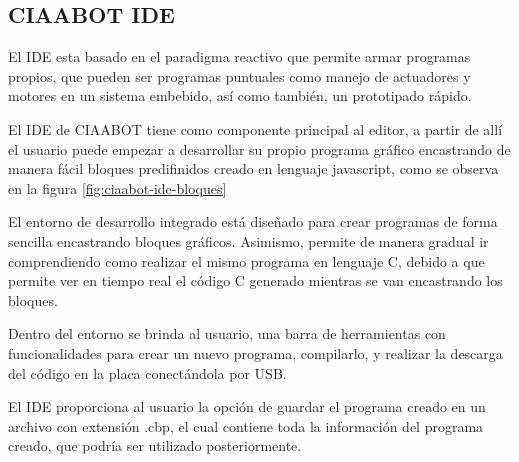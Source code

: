 \subsection{CIAABOT IDE}

El IDE esta basado en el paradigma reactivo que permite armar programas propios, que pueden ser programas puntuales como manejo de actuadores y motores
en un sistema embebido, así como también, un prototipado rápido.

El IDE de CIAABOT tiene como componente principal al editor, a partir de allí el usuario puede empezar a desarrollar su propio programa gráfico encastrando de manera fácil bloques predifinidos creado en lenguaje javascript, como se observa en la figura \ref{fig:ciaabot-ide-bloques} 

El entorno de desarrollo integrado está diseñado para crear programas de forma sencilla encastrando bloques gráficos. Asimismo, permite de manera gradual ir comprendiendo como realizar el mismo programa en lenguaje C, debido a que permite ver en tiempo real el código C generado mientras se van encastrando los bloques.

Dentro del entorno se brinda al usuario, una barra de herramientas con funcionalidades
para crear un nuevo programa, compilarlo, y realizar la descarga del
código en la placa conectándola por USB.

El IDE proporciona al usuario la opción de guardar el programa creado en un
archivo con extensión .cbp, el cual contiene toda la información del programa
creado, que podría ser utilizado posteriormente. 

